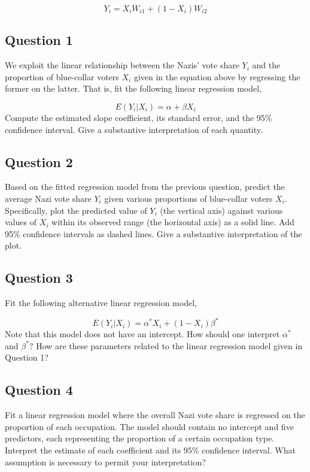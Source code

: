 \documentclass[]{article}
\begin{document}
\[
  Y_i = X_i W_{i1} + (1-X_i) W_{i2}
\]

\subsection{Question 1}\label{question-1}

We exploit the linear relationship between the Nazis' vote share $Y_i$
and the proportion of blue-collar voters $X_i$ given in the equation
above by regressing the former on the latter. That is, fit the following
linear regression model,

\[
    E(Y_i | X_i) = \alpha + \beta X_i
  \] Compute the estimated slope coefficient, its standard error, and
the 95\% confidence interval. Give a substantive interpretation of each
quantity.

\subsection{Question 2}\label{question-2}

Based on the fitted regression model from the previous question, predict
the average Nazi vote share $Y_i$ given various proportions of
blue-collar voters $X_i$. Specifically, plot the predicted value of
$Y_i$ (the vertical axis) against various values of $X_i$ within its
observed range (the horizontal axis) as a solid line. Add 95\%
confidence intervals as dashed lines. Give a substantive interpretation
of the plot.

\subsection{Question 3}\label{question-3}

Fit the following alternative linear regression model,

\[
    E(Y_i | X_i) = \alpha^\ast X_i + (1-X_i) \beta^\ast
  \] Note that this model does not have an intercept. How should one
interpret $\alpha^\ast$ and $\beta^\ast$? How are these parameters
related to the linear regression model given in Question 1?

\subsection{Question 4}\label{question-4}

Fit a linear regression model where the overall Nazi vote share is
regressed on the proportion of each occupation. The model should contain
no intercept and five predictors, each representing the proportion of a
certain occupation type. Interpret the estimate of each coefficient and
its 95\% confidence interval. What assumption is necessary to permit
your interpretation?
\end{document}
